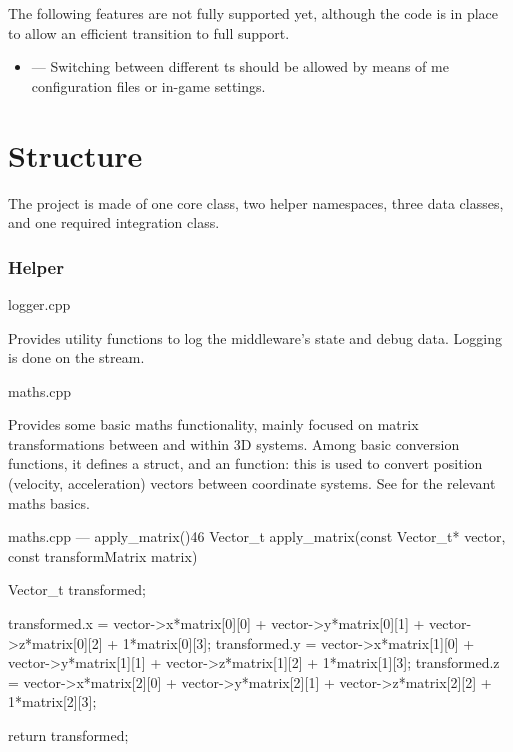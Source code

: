 The following \glspl{feature} are not fully supported yet, although the code is in place to allow an efficient transition to full support.

\begin{itemize}
	\item {} --- Switching between different \gls{ts} should be allowed by means of \gls{me} configuration files or in-game settings.
\end{itemize}

\section{Structure}\label{sc:middleware:structure}

The project is made of one core class, two helper namespaces, three data classes, and one required integration class.

\subsubsection{Helper}

\begin{filelist}
	\item logger.cpp
\end{filelist}

Provides utility functions to log the \gls{middleware}'s state and debug data. Logging is done on the  stream.

\begin{filelist}
	\item maths.cpp
\end{filelist}

Provides some basic maths functionality, mainly focused on matrix transformations between and within 3D systems. Among basic conversion functions, it defines a  struct, and an  function: this is used to convert position (velocity, acceleration) vectors between coordinate systems. See  for the relevant maths basics.

\begin{codelist}{maths.cpp --- apply\_matrix()}{46}
Vector_t apply_matrix(const Vector_t* vector, const transformMatrix matrix) {
	Vector_t transformed;

	transformed.x = vector->x*matrix[0][0] + vector->y*matrix[0][1] + vector->z*matrix[0][2] + 1*matrix[0][3];
	transformed.y = vector->x*matrix[1][0] + vector->y*matrix[1][1] + vector->z*matrix[1][2] + 1*matrix[1][3];
	transformed.z = vector->x*matrix[2][0] + vector->y*matrix[2][1] + vector->z*matrix[2][2] + 1*matrix[2][3];

	return transformed;
}
\end{codelist}

